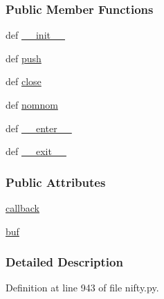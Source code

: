\subsubsection*{Public Member Functions}
\begin{DoxyCompactItemize}
\item 
def \hyperlink{classforcebalance_1_1nifty_1_1LineChunker_ae3ab9c66002ff8c9cb1c431037a5b1bd}{\-\_\-\-\_\-init\-\_\-\-\_\-}
\item 
def \hyperlink{classforcebalance_1_1nifty_1_1LineChunker_a55559f3b01f982fabd8521d3255a659c}{push}
\item 
def \hyperlink{classforcebalance_1_1nifty_1_1LineChunker_a3ff808a8e8d1f37c1509b2c8a40793a0}{close}
\item 
def \hyperlink{classforcebalance_1_1nifty_1_1LineChunker_a8136910aad30f357f0ededf79803e582}{nomnom}
\item 
def \hyperlink{classforcebalance_1_1nifty_1_1LineChunker_a968159ea8646ab0a1b5f5a9428855ce5}{\-\_\-\-\_\-enter\-\_\-\-\_\-}
\item 
def \hyperlink{classforcebalance_1_1nifty_1_1LineChunker_a02b0e239f9fba956c36c4eb5d2771132}{\-\_\-\-\_\-exit\-\_\-\-\_\-}
\end{DoxyCompactItemize}
\subsubsection*{Public Attributes}
\begin{DoxyCompactItemize}
\item 
\hyperlink{classforcebalance_1_1nifty_1_1LineChunker_aadc78efc999ffbb1decfeb593d8a3b69}{callback}
\item 
\hyperlink{classforcebalance_1_1nifty_1_1LineChunker_aad441300bffd286519b62c0f871f3867}{buf}
\end{DoxyCompactItemize}


\subsubsection{Detailed Description}


Definition at line 943 of file nifty.\-py.



